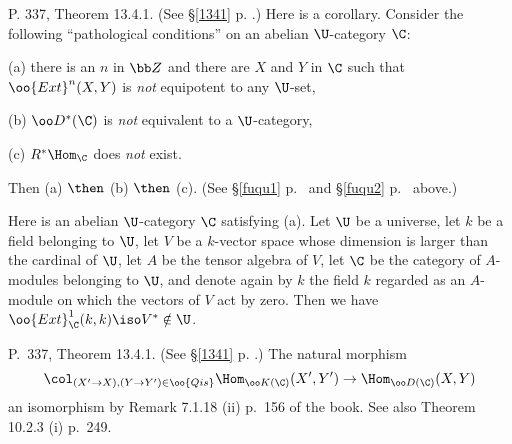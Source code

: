 \documentclass[12pt]{article}
\theoremstyle{remark}
\theoremstyle{definition}
\begin{document}
\begin{s}
P. 337, Theorem 13.4.1. (See \S\ref{1341} p. .) Here is a corollary. Consider the following ``pathological conditions'' on an abelian $\U$-category $\C$: 

\nn(a) there is an $n$ in $\bb Z$ and there are $X$ and $Y$ in $\C$ such that $\oo{Ext}^n(X,Y)$ is \emph{not} equipotent to any $\U$-set, 

\nn(b) $\oo D^*(\C)$ is \emph{not} equivalent to a $\U$-category, 

\nn(c) $R^*\Hom_\C$ does \emph{not} exist. 

\nn Then (a) $\then$ (b) $\then$ (c). (See \S\ref{fuqu1} p.~ and \S\ref{fuqu2} p.~ above.)

Here is an abelian $\U$-category $\C$ satisfying (a). Let $\U$ be a universe, let $k$ be a field belonging to $\U$, let $V$ be a $k$-vector space whose dimension is larger than the cardinal of $\U$, let $A$ be the tensor algebra of $V$, let $\C$ be the category of $A$-modules belonging to $\U$, and denote again by $k$ the field $k$ regarded as an $A$-module on which the vectors of $V$ act by zero. Then we have $\oo{Ext}^1_\C(k,k)\iso V^*\notin\U$.
\end{s}

%

\begin{s}
P.~337, Theorem 13.4.1. (See \S\ref{1341} p. .) The natural morphism 
$$
\col_{(X'\to X),(Y\to Y')\in\oo{Qis}}\Hom_{\oo K(\C)}(X',Y')\to\Hom_{\oo D(\C)}(X,Y)
$$  
an isomorphism by Remark 7.1.18 (ii) p.~156 of the book. See also Theorem 10.2.3 (i) p.~249.
\end{s}
\end{document}
